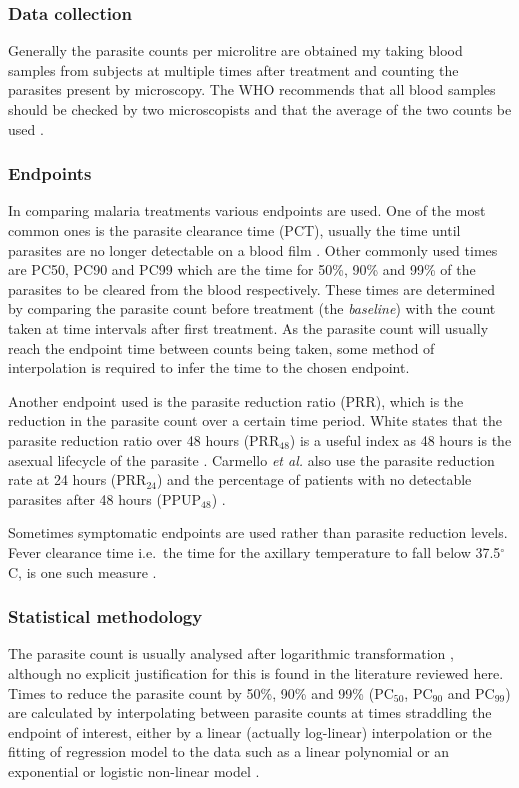 \subsubsection*{Data collection}
Generally the parasite counts per microlitre are obtained my taking blood samples from subjects at multiple times after treatment and counting the parasites present by microscopy. The WHO recommends that all blood samples should be checked by two microscopists and that the average of the two counts be used \cite{protocolWHO}.

\subsubsection*{Endpoints}
In comparing malaria treatments various endpoints are used. One of the most common ones is the parasite clearance time (PCT), usually the time until parasites are no longer detectable on a blood film \cite{white}. Other commonly used times are PC50, PC90 and PC99 which are the time for 50\%, 90\% and 99\% of the parasites to be cleared from the blood respectively. These times are determined by comparing the parasite count before treatment (the \textit{baseline}) with the count taken at time intervals after first treatment. As the parasite count will usually reach the endpoint time between counts being taken, some method of interpolation is required to infer the time to the chosen endpoint.

Another endpoint used is the parasite reduction ratio (PRR), which is the reduction in the parasite count over a certain time period. White states that the parasite reduction ratio over 48 hours (PRR$_{48}$) is a useful index as 48 hours is the asexual lifecycle of the parasite \cite{white}. Carmello \textit{et al.} also use the parasite reduction rate at 24 hours (PRR$_{24}$) and the percentage of patients with no detectable parasites after 48 hours (PPUP$_{48}$) \cite{carmello}.

Sometimes symptomatic endpoints are used rather than parasite reduction levels.  Fever clearance time i.e.\ the time for the axillary temperature to fall below 37.5$^\circ$C, is one such measure \cite{bell,newton}.

\subsubsection*{Statistical methodology}
The parasite count is usually analysed after logarithmic transformation \cite{vries, wootton, carmello}, although no explicit justification for this is found in the literature reviewed here. Times to reduce the parasite count by 50\%, 90\% and 99\% (PC$_{50}$, PC$_{90}$ and PC$_{99}$) are calculated by interpolating between parasite counts at times straddling the endpoint of interest, either by a linear (actually log-linear) interpolation \cite{newton, carmello} or the fitting of regression model to the data such as a linear polynomial or an exponential \cite{vries} or logistic non-linear model \cite{wootton}.

